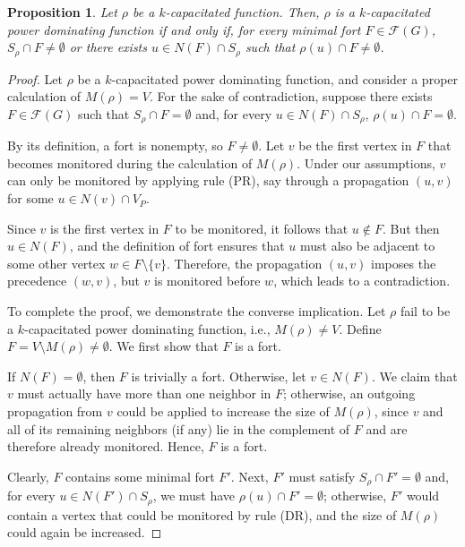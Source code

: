 \documentclass{article}
\newcommand{\FORT}{{\mathscr F}}
\newtheorem{proposition}{Proposition}
\begin{document}
\begin{proposition}\label{prop.fort.cpds}
Let $\rho$ be a $k$-capacitated function.
Then, $\rho$ is a $k$-capacitated power dominating function if and only if, for every minimal fort $F \in \FORT(G)$, $S_{\rho} \cap F \neq \emptyset$ or there exists $u \in N(F) \cap S_{\rho}$ such that $\rho(u) \cap F \neq \emptyset$. 
\end{proposition}
\begin{proof}
Let $\rho$ be a $k$-capacitated power dominating function, and consider a proper calculation of $M(\rho) = V$.
For the sake of contradiction, suppose there exists $F \in \FORT(G)$ such that $S_{\rho} \cap F = \emptyset$ and, for every $u \in N(F) \cap S_{\rho}$, $\rho(u) \cap F = \emptyset$.

By its definition, a fort is nonempty, so $F \neq \emptyset$.
Let $v$ be the first vertex in $F$ that becomes monitored during the calculation of $M(\rho)$.
Under our assumptions, $v$ can only be monitored by applying rule (PR), say through a propagation $(u,v)$ for some $u \in N(v) \cap V_P$.

Since $v$ is the first vertex in $F$ to be monitored, it follows that $u \notin F$.
But then $u \in N(F)$, and the definition of fort ensures that $u$ must also be adjacent to some other vertex $w \in F \setminus \{v\}$.
Therefore, the propagation $(u,v)$ imposes the precedence $(w,v)$, but $v$ is monitored before $w$, which leads to a contradiction.

\medskip

To complete the proof, we demonstrate the converse implication.
Let $\rho$ fail to be a $k$-capacitated power dominating function, i.e., $M(\rho) \neq V$.
Define $F = V \setminus M(\rho) \neq \emptyset$.
We first show that $F$ is a fort.

If $N(F) = \emptyset$, then $F$ is trivially a fort.
Otherwise, let $v \in N(F)$.
We claim that $v$ must actually have more than one neighbor in $F$; otherwise, an outgoing propagation from $v$ could be applied to increase the size of $M(\rho)$, since $v$ and all of its remaining neighbors (if any) lie in the complement of $F$ and are therefore already monitored.
Hence, $F$ is a fort.

Clearly, $F$ contains some minimal fort $F'$.
Next, $F'$ must satisfy $S_{\rho} \cap F' = \emptyset$ and, for every $u \in N(F') \cap S_{\rho}$, we must have $\rho(u) \cap F' = \emptyset$; otherwise, $F'$ would contain a vertex that could be monitored by rule (DR), and the size of $M(\rho)$ could again be increased.
\end{proof}
\end{document}
